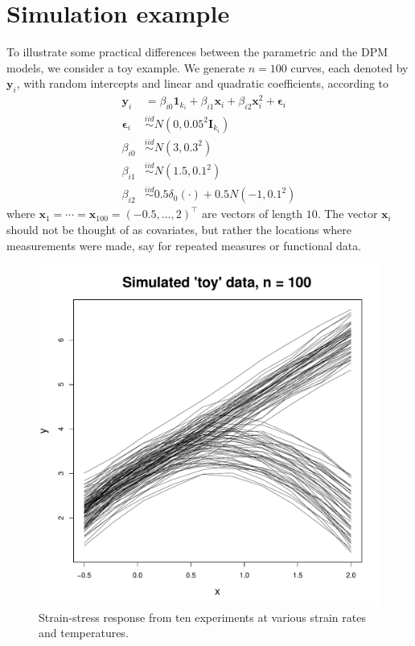 \documentclass[12pt]{article}
\newcommand{\m}[1]{\mathbf{\bm{#1}}}
\begin{document}
\section{Simulation example}

To illustrate some practical differences between the parametric and the DPM models, we consider a toy example. We generate $n=100$ curves, each denoted by $\m{y}_i$, with random intercepts and linear and quadratic coefficients, according to
\begin{align*}
\m{y}_i &= \beta_{i0}\m{1}_{k_i} + \beta_{i1}\m{x}_i + \beta_{i2}\m{x}_i^2 + \m{\epsilon}_i \\
\m{\epsilon}_i &\overset{iid}\sim N(0, 0.05^2\m{I}_{k_i}) \\
\beta_{i0} &\overset{iid}\sim N(3, 0.3^2) \\
\beta_{i1} &\overset{iid}\sim N(1.5, 0.1^2) \\
\beta_{i2} &\overset{iid}\sim 0.5\delta_0(\cdot) + 0.5N(-1, 0.1^2)
\end{align*}
where $\m{x}_1=\cdots=\m{x}_{100}=(-0.5,\ldots,2)^\top$ are vectors of length $10$. The vector $\m{x}_i$ should not be thought of as covariates, but rather the locations where measurements were made, say for repeated measures or functional data.

\begin{figure}[H]
\begin{center}
\includegraphics[scale=0.40]{../figs/toy_data.pdf}
\caption{Strain-stress response from ten experiments at various strain rates and temperatures.}
\end{center}
\end{figure}
\end{document}
